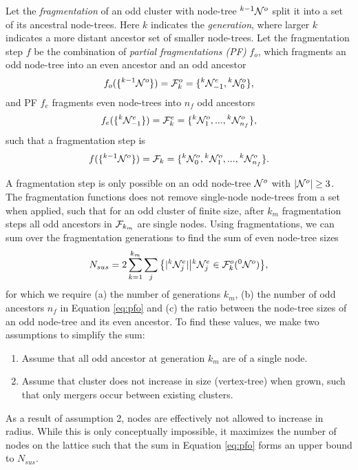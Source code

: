 \begin{definition}\label{def:fragmentation}
  Let the \emph{fragmentation} of an odd cluster with node-tree ${}^{k-1}\mathcal{N}^o$ split it into a set of its ancestral node-trees. Here $k$ indicates the \emph{generation}, where larger $k$ indicates a more distant ancestor set of smaller node-trees. Let the fragmentation step $f$ be the combination of \emph{partial fragmentations (PF)} $f_o$, which fragments an odd node-tree into an even ancestor and an odd ancestor
  \begin{equation}\label{eq:pfe}
    f_o(\{\pre{k-1}\nset^o\}) = \m{F}^o_k = \{\pre{k}\nset^e_{-1}, \pre{k}\nset^o_0 \}, 
  \end{equation}
  and PF $f_e$ fragments even node-trees into $n_f$ odd ancestors
  \begin{equation}\label{eq:pfo}
    f_e(\{\pre{k}\nset^e_{-1}\}) = \m{F}^e_k=\{\pre{k}\nset^{o}_1,...,\pre{k}\nset^o_{n_f}\},
  \end{equation}
  such that a fragmentation step is
  \begin{equation}\label{eq:fstep}
    f(\{\pre{k-1}\nset^o\}) = \m{F}_k = \{\pre{k}\nset^o_0,\pre{k}\nset^{o}_1,...,\pre{k}\nset^{o}_{n_f}\}.
  \end{equation}
\end{definition}

A fragmentation step is only possible on an odd node-tree $\mathcal{N}^o$ with $|{\mathcal{N}^o}| \geq 3$. The fragmentation functions does not remove single-node node-trees from a set when applied, such that for an odd cluster of finite size, after $k_m$ fragmentation steps all odd ancestors in $\mathcal{F}_{k_{m}}$ are single nodes. Using fragmentations, we can sum over the fragmentation generations to find the sum of even node-tree sizes
\begin{equation}\label{eq:npdc}
  N_{sus} = 2\sum_{k=1}^{k_{m}}{ \sum_j{ \left\{ \abs{\pre{k}\nset_j^e} \big| \pre{k}\nset_j^e \in \m{F}^o_k(\pre{0}\nset^o)\right\} } },
\end{equation}
for which we require (a) the number of generations $k_m$, (b) the number of odd ancestors $n_f$ in Equation \eqref{eq:pfo} and (c) the ratio between the node-tree sizes of an odd node-tree and its even ancestor. To find these values, we make two assumptions to simplify the sum: 
\begin{enumerate}
  \item Assume that all odd ancestor at generation $k_m$ are of a single node. 
  \item Assume that cluster does not increase in size (vertex-tree) when grown, such that only mergers occur between existing clusters. 
\end{enumerate}
As a result of assumption 2, nodes are effectively not allowed to increase in radius. While this is only conceptually impossible, it maximizes the number of nodes on the lattice such that the sum in Equation \eqref{eq:pfo} forms an upper bound to $N_{sus}$. 

